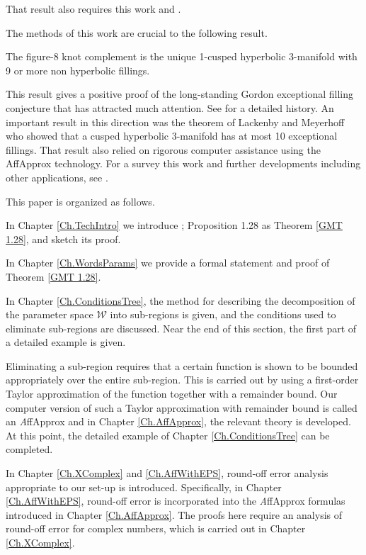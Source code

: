 That result also requires this work and \cite{GMT}.  \vskip 8pt

The methods of this work are crucial to the following result.

\begin{theorem} \cite{GHMTY} The figure-8 knot complement is the unique 1-cusped hyperbolic 3-manifold with 9 or more non hyperbolic fillings.  \end{theorem}
 
This result gives a positive proof of the long-standing Gordon exceptional filling conjecture that has attracted much attention.  See \cite{GHMTY} for a detailed history.  An important result in this direction was the theorem of Lackenby and Meyerhoff \cite{LM} who showed that a cusped hyperbolic 3-manifold has at most 10 exceptional fillings.  That result also relied on rigorous computer assistance using the AffApprox technology.
\vskip 8pt
For a survey this work and further developments including other applications, see \cite{GMTY}.
\vskip 8pt

This paper is organized as follows.

In Chapter \ref{Ch.TechIntro} we introduce
\cite{GMT}; Proposition 1.28 as Theorem \ref{GMT 1.28},
and sketch its proof.

In Chapter \ref{Ch.WordsParams} we provide a formal statement and proof of Theorem \ref{GMT 1.28}.

In Chapter \ref{Ch.ConditionsTree},
the method for describing the decomposition
of the parameter space ${\mathcal W}$ into sub-regions is given,
and the conditions used to eliminate sub-regions are discussed.
Near the end of this section, the first part of a detailed example is given.

Eliminating 
a sub-region requires that a certain function is shown to be bounded 
appropriately over the entire sub-region.  This is carried out by using a 
first-order Taylor approximation of the function together with a 
remainder 
bound.
Our computer version of such a Taylor approximation with remainder bound 
is called an {\textit AffApprox} and in Chapter \ref{Ch.AffApprox},
the relevant theory is developed.
At this point, the detailed example of Chapter \ref{Ch.ConditionsTree} can be completed.

In Chapter \ref{Ch.XComplex} and \ref{Ch.AffWithEPS}, round-off error analysis appropriate to our 
set-up is introduced.  Specifically, in Chapter \ref{Ch.AffWithEPS}, round-off error is 
incorporated 
into the {\textit AffApprox} formulas introduced in Chapter \ref{Ch.AffApprox}.  The proofs here 
require an analysis of round-off error for complex numbers, which is carried 
out in Chapter \ref{Ch.XComplex}.

